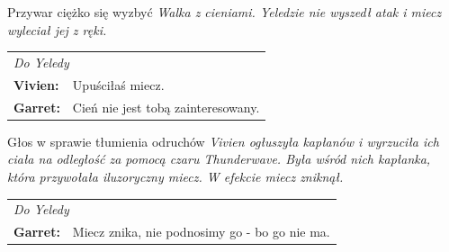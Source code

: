 \documentclass[10pt,twoside,twocolumn]{book}
\begin{document}
\begin{rpg-quotebox}{Przywar ciężko się wyzbyć}
   \textit{Walka z cieniami. Yeledzie nie wyszedł atak i miecz wyleciał jej z ręki.}\\
   
   \begin{tabularx}{\columnwidth}{lX}
      \multicolumn{2}{l}{\textit{Do Yeledy}}\\
      
      \textbf{Vivien:} & Upuściłaś miecz.\\
      \textbf{Garret:} & Cień nie jest tobą zainteresowany.\\
   \end{tabularx}
\end{rpg-quotebox}


\begin{rpg-quotebox}{Głos w sprawie tłumienia odruchów}
   \textit{Vivien ogłuszyła kapłanów i wyrzuciła ich ciała na odległość za pomocą czaru Thunderwave. Była wśród nich kapłanka, która przywołała iluzoryczny miecz. W efekcie miecz zniknął.}\\
   
   \begin{tabularx}{\columnwidth}{lX}
      \multicolumn{2}{l}{\textit{Do Yeledy}}\\
      
      \textbf{Garret:} & Miecz znika, nie podnosimy go - bo go nie ma.\\
   \end{tabularx}
\end{rpg-quotebox}
\end{document}
